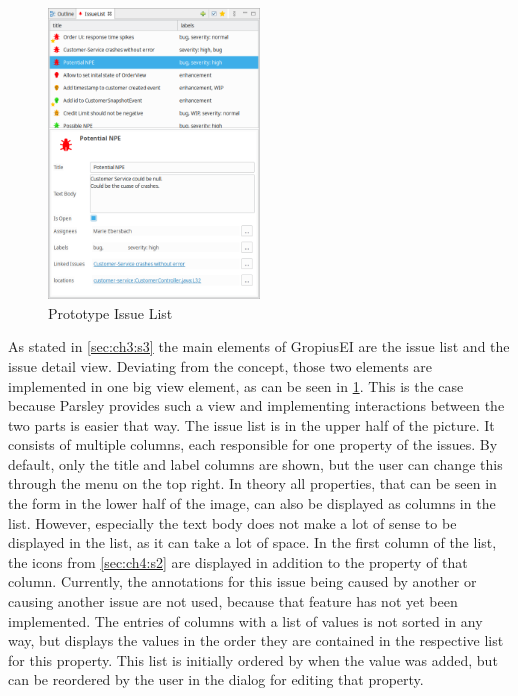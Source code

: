 \begin{figure}[!h]
	\centering
	\includegraphics[width=0.5\textwidth]{graphics/screenshot_gropius_ei_issue_list.png}
	\caption{Prototype Issue List}
	\label{fig:c4:screenshot_issue_list}
\end{figure}
As stated in \cref{sec:ch3:s3} the main elements of \gls{GropiusEI} are the issue list and the issue detail view.
Deviating from the concept, those two elements are implemented in one big view element, as can be seen in \cref{fig:c4:screenshot_issue_list}.
This is the case because \gls{Parsley} provides such a view and implementing interactions between the two parts is easier that way.
The issue list is in the upper half of the picture. 
It consists of multiple columns, each responsible for one property of the issues.
By default, only the title and label columns are shown, but the user can change this through the menu on the top right.
In theory all properties, that can be seen in the form in the lower half of the image, can also be displayed as columns in the list.
However, especially the text body does not make a lot of sense to be displayed in the list, as it can take a lot of space.
In the first column of the list, the icons from \ref{sec:ch4:s2} are displayed in addition to the property of that column.
Currently, the annotations for this issue being caused by another or causing another issue are not used, because that feature has not yet been implemented.
The entries of columns with a list of values is not sorted in any way, but displays the values in the order they are contained in the respective list for this property.
This list is initially ordered by when the value was added, but can be reordered by the user in the dialog for editing that property.


